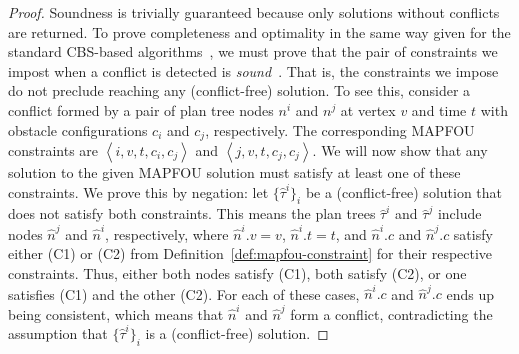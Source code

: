 \documentclass[letterpaper]{article} %
\newcommand{\tuple}[1]{\ensuremath{\left \langle #1 \right \rangle }}
\begin{document}
\begin{proof}
Soundness is trivially guaranteed because only solutions without conflicts are returned. 
To prove completeness and optimality in the same way given for the standard CBS-based algorithms~\cite{sharon2015conflict,atzmon2020robust,li2020new}, we must prove that the pair of constraints we impost when a conflict is detected is \emph{sound}~\cite{atzmon2020robust,li2020new}. 
That is, the constraints we impose do not preclude reaching any (conflict-free) solution. 
To see this, consider a conflict formed by a pair of plan tree nodes
$n^i$ and $n^j$ at vertex $v$ and time $t$ with obstacle configurations $c_i$ and $c_j$, respectively. 
The corresponding MAPFOU constraints are $\tuple{i,v,t,c_i,c_j}$
and $\tuple{j,v,t,c_j,c_j}$. 
We will now show that any solution to the given MAPFOU solution must satisfy at least one of these constraints. 
We prove this by negation: let $\{\hat{\tau}^i\}_i$ be a (conflict-free) solution that does not satisfy both constraints. 
This means the plan trees $\hat{\tau}^i$ and $\hat{\tau}^j$
include nodes 
$\hat{n}^j$ and
$\hat{n}^i$, respectively, 
where $\hat{n}^i.v=v$, $\hat{n}^i.t=t$, 
and $\hat{n}^i.c$ and $\hat{n}^j.c$
satisfy either (C1) or (C2) from Definition~\ref{def:mapfou-constraint}
for their respective constraints. 
Thus, either both nodes satisfy (C1), both satisfy (C2), or one satisfies (C1) and the other (C2).  
For each of these cases, $\hat{n}^i.c$ and $\hat{n}^j.c$ ends up being consistent, which means that $\hat{n}^i$ and $\hat{n}^j$ form a conflict, contradicting the assumption that $\{\hat{\tau}^i\}_i$ is a (conflict-free) solution. 
\end{proof}
\end{document}
